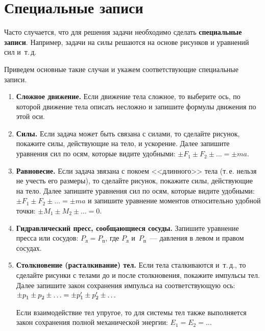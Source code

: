 \documentclass[main.tex]{subfiles}
\begin{document}



 
   


\section{Специальные записи}

Часто случается, что для решения задачи необходимо сделать \textbf{специальные записи}. Например, задачи на силы решаются на основе рисунков и уравнений сил и~т.\,д. 

Приведем основные такие случаи и укажем соответствующие специальные записи.

\begin{enumerate}
    \item \textbf{Сложное движение.} Если движение тела сложное, то выберите ось, по которой движение тела описать несложно и запишите формулы движения по этой оси.  
    
    \item \textbf{Силы.} Если задача может быть связана с силами, то сделайте рисунок, покажите силы, действующие на тело, и ускорение. Далее запишите уравнения сил по осям, которые видите удобными: $\pm F_1\pm F_2\pm\ldots=\pm ma$.
    
    \item \textbf{Равновесие.} Если задача звязана с покоем <<длинного>> тела (т.\,е. нельзя не учесть его размеры), то сделайте рисунок, покажите силы, действующие на тело. Далее запишите уравнения сил по осям, которые видите удобными: $\pm F_1\pm F_2\pm\ldots=\pm ma$ и запишите уравнение моментов относительно удобной точки: $\pm M_1\pm M_2\pm\ldots=0$.  
    
    \item \textbf{Гидравлический пресс, сообщающиеся сосуды.} Запишите уравнение пресса или сосудов: $P_\text{л}=P_\text{п}$, где $P_\text{л}$ и~$P_\text{п}$~--- давления в левом и правом сосудах.

    \item \textbf{Столкновение (расталкивание) тел.} Если тела сталкиваются и~т.\,д., то сделайте рисунки с телами до и после столкновения, покажите импульсы тел. Далее запишите закон сохранения импульса на соответствующую ось: $\pm p^{\vphantom{'}}_\text{1} \pm p^{\vphantom{'}}_\text{2}\pm\ldots\hm = \pm p'_{1} \pm p'_{2}\pm\ldots$
    
    Если взаимодействие тел упругое, то для системы тел также выполняется закон сохранения полной механической энергии: $E_1=E_2=\ldots$


\end{enumerate}
\end{document}

